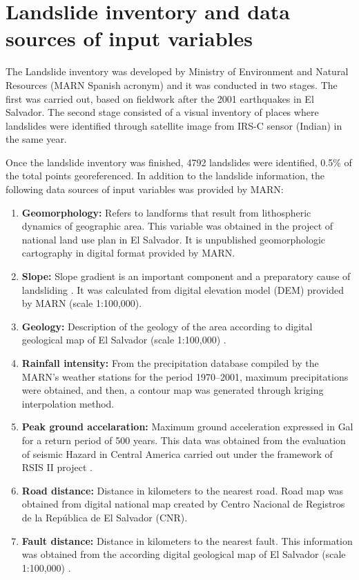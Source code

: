 \documentclass[11pt,twoside]{rmta2010eng}%
\begin{document}
\section{Landslide inventory and data sources of input variables}
\label{sec:landsinvet}
The Landslide inventory was developed by Ministry of Environment and Natural Resources (MARN Spanish acronym) and it was conducted in two stages. The first was carried out, based on fieldwork after the 2001 earthquakes in El Salvador. The second stage consisted of a visual inventory of places where landslides were identified through satellite image from IRS-C sensor (Indian) in the same year.


Once the landslide inventory was finished, 4792 landslides were identified, 0.5\% of the total points georeferenced. In addition to the landslide information, the following data sources of input variables was provided by MARN: 


\begin{enumerate}
\item {\bf Geomorphology:} Refers to landforms that result from lithospheric dynamics of geographic area. This variable was obtained in the project of national land use plan in El Salvador. It is unpublished geomorphologic cartography in digital format provided by MARN.


\item {\bf Slope:} Slope gradient is an important component and a
preparatory cause of landsliding \cite{garcia2008}. It was calculated from digital elevation model (DEM) provided by MARN (scale 1:100,000). 

\item {\bf Geology:} Description of the geology of the area according to digital geological map of  El Salvador (scale 1:100,000) \cite{weber}.

\item {\bf Rainfall intensity:} From the precipitation database compiled by the
MARN's weather stations for the period 1970–2001, maximum precipitations were obtained, 
and then, a contour map was generated through kriging interpolation method.

\item {\bf Peak ground accelaration:} Maximum ground acceleration expressed in Gal for a return period of 500 years. This data was obtained from the evaluation of seismic Hazard in Central America carried out under the framework of RSIS II project \cite{beni2012}.

\item {\bf Road distance:} Distance in kilometers to the nearest road. Road map was obtained from digital national map created by Centro Nacional de Registros de la Rep\'{u}blica de El Salvador (CNR).

\item {\bf Fault distance:} Distance in kilometers to the nearest fault. This information was obtained from the according digital geological map of El Salvador (scale 1:100,000) \cite{weber}.
 
\end{enumerate}
\end{document}

